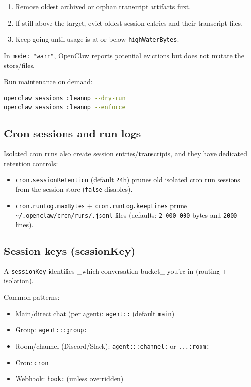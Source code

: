 \begin{enumerate}
  \item Remove oldest archived or orphan transcript artifacts first.
  \item If still above the target, evict oldest session entries and their transcript files.
  \item Keep going until usage is at or below \texttt{highWaterBytes}.
\end{enumerate}


In \texttt{mode: "warn"}, OpenClaw reports potential evictions but does not mutate the store/files.

Run maintenance on demand:

\begin{lstlisting}[language=bash]
openclaw sessions cleanup --dry-run
openclaw sessions cleanup --enforce
\end{lstlisting}


\hrulefill


\subsection{Cron sessions and run logs}


Isolated cron runs also create session entries/transcripts, and they have dedicated retention controls:

\begin{itemize}
  \item \texttt{cron.sessionRetention} (default \texttt{24h}) prunes old isolated cron run sessions from the session store (\texttt{false} disables).
  \item \texttt{cron.runLog.maxBytes} + \texttt{cron.runLog.keepLines} prune \texttt{\textasciitilde{}/.openclaw/cron/runs/.jsonl} files (defaults: \texttt{2\_000\_000} bytes and \texttt{2000} lines).
\end{itemize}


\hrulefill


\subsection{Session keys (sessionKey)}


A \texttt{sessionKey} identifies \_which conversation bucket\_ you’re in (routing + isolation).

Common patterns:

\begin{itemize}
  \item Main/direct chat (per agent): \texttt{agent::} (default \texttt{main})
  \item Group: \texttt{agent:::group:}
  \item Room/channel (Discord/Slack): \texttt{agent:::channel:} or \texttt{...:room:}
  \item Cron: \texttt{cron:}
  \item Webhook: \texttt{hook:} (unless overridden)
\end{itemize}


